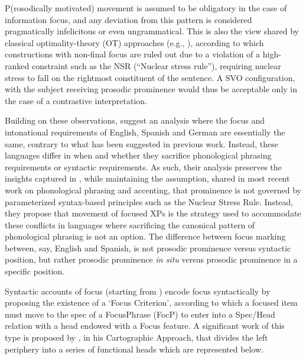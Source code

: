 \begin{description}
P(rosodically motivated) movement is assumed to be obligatory in the case of information focus, and any deviation from this pattern is considered pragmatically infelicitous or even ungrammatical. This is also the view shared by classical optimality-theory (OT) approaches (e.g.,  \cite{costa2001postverbal, gutierrez2013structural, samek2001crosslinguistic}), according to which constructions with non-final focus are ruled out due to a violation of a high-ranked constraint such as the NSR (“Nuclear stress rule”), requiring nuclear stress to fall on the rightmost constituent of the sentence. A SVO configuration, with the subject receiving prosodic prominence would thus be acceptable only in the case of a contrastive interpretation.

Building on these observations, \textcite{buring2001focus} suggest an analysis where the focus and intonational requirements of English, Spanish and German are essentially the same, contrary to what has been suggested in previous work.  Instead, these languages differ in when and whether they sacrifice phonological phrasing requirements or syntactic requirements.  As such, their analysis preserves the insights captured in \textcite{zubizarreta1998prosody}, while maintaining the assumption, shared in most recent work on phonological phrasing and accenting, that prominence is not governed by parameterized syntax-based principles such as the Nuclear Stress Rule. Instead, they propose that movement of focused XPs is the strategy used to accommodate these conflicts in languages where sacrificing the canonical pattern of phonological phrasing is not an option. The difference between focus marking between, say, English and Spanish, is not prosodic prominence versus syntactic position, but rather prosodic prominence \textit{in situ} versus prosodic prominence in a specific position.\\

\item[2.  \textbf{Syntactic reasons}]

Syntactic accounts of focus (starting from \cite{brody1990some}) encode focus  syntactically  by  proposing  the  existence  of  a  ‘Focus  Criterion’, according to which a focused item must move to the spec of a FocusPhrase (FocP) to enter into a Spec/Head relation with a head endowed with a Focus feature. A significant work of this type is proposed by \textcite{rizzi1997fine}, in his Cartographic Approach, that divides the left periphery into a series of functional heads which are represented below.


\end{description}
